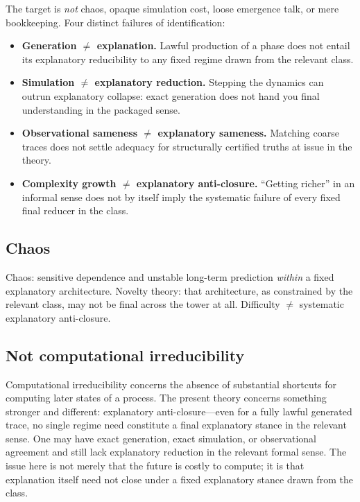 \documentclass[11pt,a4paper]{article}
\newenvironment{keybox}[1]{%
  \Needspace*{8\baselineskip}%
  \begin{tcolorbox}[
    enhanced, breakable=false,
    colback=blue!5, colframe=blue!45!black, coltitle=black,
    colbacktitle=blue!14, boxrule=0.85pt, arc=2.5pt,
    left=9pt, right=9pt, top=6pt, bottom=6pt,
    titlerule=0.55pt, fonttitle=\bfseries, title={#1},
    before upper=\raggedright,
    before skip=0.9\baselineskip, after skip=0.9\baselineskip
  ]%
}{%
  \end{tcolorbox}%
}
\theoremstyle{definition}
\begin{document}
\begin{keybox}{Disagreement coordinates: reject these identifications}
The target is \emph{not} chaos, opaque simulation cost, loose emergence talk, or mere bookkeeping. Four distinct failures of identification:
\begin{itemize}[leftmargin=2em]
\item \textbf{Generation $\neq$ explanation.} Lawful production of a phase does not entail its explanatory reducibility to any fixed regime drawn from the relevant class.
\item \textbf{Simulation $\neq$ explanatory reduction.} Stepping the dynamics can outrun explanatory collapse: exact generation does not hand you final understanding in the packaged sense.
\item \textbf{Observational sameness $\neq$ explanatory sameness.} Matching coarse traces does not settle adequacy for structurally certified truths at issue in the theory.
\item \textbf{Complexity growth $\neq$ explanatory anti-closure.} ``Getting richer'' in an informal sense does not by itself imply the systematic failure of every fixed final reducer in the class.
\end{itemize}
\end{keybox}

\subsection{Chaos}

Chaos: sensitive dependence and unstable long-term prediction \emph{within} a fixed explanatory architecture. Novelty theory: that architecture, as constrained by the relevant class, may not be final across the tower at all. Difficulty $\neq$ systematic explanatory anti-closure.

\subsection{Not computational irreducibility}

Computational irreducibility \cite{Wolfram2002} concerns the absence of substantial shortcuts for computing later states of a process. The present theory concerns something stronger and different: explanatory anti-closure---even for a fully lawful generated trace, no single regime need constitute a final explanatory stance in the relevant sense. One may have exact generation, exact simulation, or observational agreement and still lack explanatory reduction in the relevant formal sense. The issue here is not merely that the future is costly to compute; it is that explanation itself need not close under a fixed explanatory stance drawn from the class.
\end{document}
